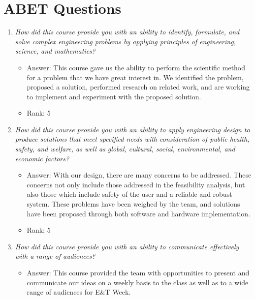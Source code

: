 \documentclass[conference]{IEEEtran}
\begin{document}
\section*{\textbf{ABET Questions}}
\begin{enumerate}
    \vspace{.6cm}
    
    \item \textit{How did this course provide you with an ability to identify, formulate, and solve complex engineering problems by applying principles of engineering, science, and mathematics?}
    \begin{itemize}
        \vspace{.3cm}
        \item Answer: This course gave us the ability to perform the scientific method for a problem that we have great interest in. We identified the problem, proposed a solution, performed research on related work, and are working to implement and experiment with the proposed solution. 
        \item Rank: 5
        \vspace{.3cm}
    \end{itemize}
    \item \textit{How did this course provide you with an ability to apply engineering design to produce solutions that meet specified needs with consideration of public health, safety, and welfare, as well as global, cultural, social, environmental, and economic factors?}
    \vspace{.3cm}
    \begin{itemize}
        \item Answer: With our design, there are many concerns to be addressed. These concerns not only include those addressed in the feasibility analysis, but also those which include safety of the user and a reliable and robust system. These problems have been weighed by the team, and solutions have been proposed through both software and hardware implementation. 
        \item Rank: 5
        \vspace{.3cm}
    \end{itemize}
    \item \textit{How did this course provide you with an ability to communicate effectively with a range of audiences?}
    \begin{itemize}
        \vspace{.3cm}
        \item Answer: This course provided the team with opportunities to present and communicate our ideas on a weekly basis to the class as well as to a wide range of audiences for E\&T Week.

\end{itemize}
\end{enumerate}
\end{document}
